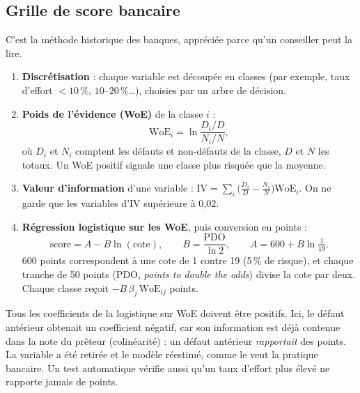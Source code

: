 \documentclass[11pt,a4paper]{article}
\begin{document}
\subsection{Grille de score bancaire}
C'est la méthode historique des banques, appréciée parce qu'un conseiller peut la lire.
\begin{enumerate}
\item \textbf{Discrétisation} : chaque variable est découpée en classes (par exemple, taux d'effort $<10\,\%$, $10$–$20\,\%$…), choisies par un arbre de décision.
\item \textbf{Poids de l'évidence (WoE)} de la classe $i$ :
\[
\mathrm{WoE}_i = \ln\frac{D_i / D}{N_i / N},
\]
où $D_i$ et $N_i$ comptent les défauts et non-défauts de la classe, $D$ et $N$ les totaux. Un WoE positif signale une classe plus risquée que la moyenne.
\item \textbf{Valeur d'information} d'une variable : $\mathrm{IV} = \sum_i \big(\frac{D_i}{D} - \frac{N_i}{N}\big)\mathrm{WoE}_i$. On ne garde que les variables d'IV supérieure à 0,02.
\item \textbf{Régression logistique sur les WoE}, puis conversion en points :
\[
\text{score} = A - B\ln(\text{cote}), \qquad B = \frac{\text{PDO}}{\ln 2}, \qquad A = 600 + B\ln\tfrac{1}{19}.
\]
600 points correspondent à une cote de 1 contre 19 (5\,\% de risque), et chaque tranche de 50 points (PDO, \emph{points to double the odds}) divise la cote par deux. Chaque classe reçoit $-B\,\beta_j\,\mathrm{WoE}_{ij}$ points.
\end{enumerate}

\begin{alerte}
Tous les coefficients de la logistique sur WoE doivent être positifs. Ici, le défaut antérieur obtenait un coefficient négatif, car son information est déjà contenue dans la note du prêteur (colinéarité) : un défaut antérieur \emph{rapportait} des points. La variable a été retirée et le modèle réestimé, comme le veut la pratique bancaire. Un test automatique vérifie aussi qu'un taux d'effort plus élevé ne rapporte jamais de points.
\end{alerte}
\end{document}
